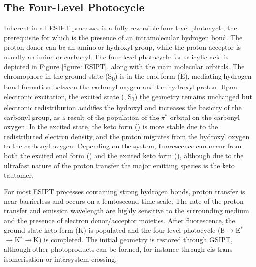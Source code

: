 \subsection{The Four-Level Photocycle}
Inherent in all \ac{ESIPT} processes is a fully reversible four-level photocycle, the prerequisite for which is the presence of an intramolecular hydrogen bond. The proton donor can be an amino or hydroxyl group, while the proton acceptor is usually an imine or carbonyl. The four-level photocycle for salicylic acid is depicted in Figure \ref{figure: ESIPT}, along with the main molecular orbitals. The chromophore in the ground state (S\textsubscript{0}) is in the enol form (E), mediating hydrogen bond formation between the carbonyl oxygen and the hydroxyl proton. Upon electronic excitation, the excited state (\Estar, S\textsubscript{1}) the geometry remains unchanged but electronic redistribution acidifies the hydroxyl and increases the basicity of the carbonyl group, as a result of the population of the $\pi^\ast$ orbital on the carbonyl oxygen. In the excited state, the keto form (\Kstar) is more stable due to the redistributed electron density, and the proton migrates from the hydroxyl oxygen to the carbonyl oxygen. Depending on the system, fluorescence can occur from both the excited enol form (\Estar) and the excited keto form (\Kstar), although due to the ultrafast nature of the proton transfer the major emitting species is the keto tautomer.\cite{Zhao2012} 

For most \ac{ESIPT} processes containing strong hydrogen bonds, proton transfer is near barrierless and  occurs on a femtosecond time scale.\cite{Padalkar2015} The rate of the proton transfer and emission wavelength are highly sensitive to the surrounding medium and the presence of electron donor/acceptor moieties.\cite{Demchenko2013,Lin2017a,Li2017c} After fluorescence, the ground state keto form (K) is populated and the four level photocycle (E$\rightarrow$E$^{\ast}$$\rightarrow$K$^{\ast}$$\rightarrow$K) is completed. The initial geometry is restored through \ac{GSIPT}, although other photoproducts can be formed, for instance through cis-trans isomerisation or intersystem crossing.\cite{Al-Soufi1990}

